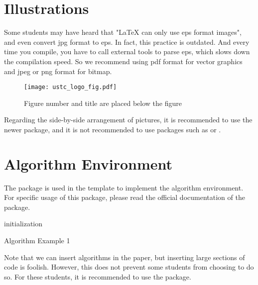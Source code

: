 \section{Illustrations}

Some students may have heard that "\LaTeX{} can only use eps format images", and even convert jpg format to eps.
In fact, this practice is outdated.
And every time you compile, you have to call external tools to parse eps, which slows down the compilation speed.
So we recommend using pdf format for vector graphics and jpeg or png format for bitmap.
\begin{figure}[htb]
  \centering
  \texttt{[image: ustc\_logo\_fig.pdf]}
  \caption{Figure number and title are placed below the figure}
  \label{fig:logo}
\end{figure}

Regarding the side-by-side arrangement of pictures, it is recommended to use the newer  package,
and it is not recommended to use packages such as  or .



\section{Algorithm Environment}

The  package is used in the template to implement the algorithm environment. For specific usage of this package,
please read the official documentation of the package.

\begin{algorithm}[htb]
  \small
  \SetAlgoLined

  initialization\;
  \caption{Algorithm Example 1}
  \label{algo:algorithm1}
\end{algorithm}

Note that we can insert algorithms in the paper, but inserting large sections of code is foolish.
However, this does not prevent some students from choosing to do so. For these students, it is recommended to use the  package.
